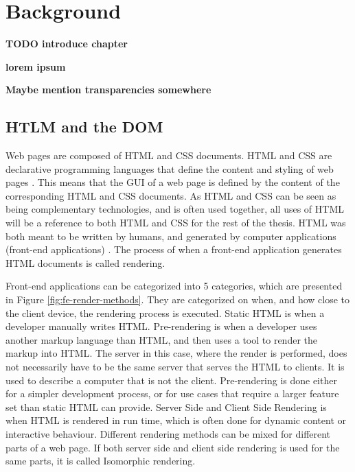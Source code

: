\chapter{Background}

\textbf{TODO introduce chapter}

\textbf{lorem ipsum}

\textbf{Maybe mention transparencies somewhere}

\section{HTLM and the DOM}

Web pages are composed of \ac{HTML} and \ac{CSS} documents. \ac{HTML} and \ac{CSS} are declarative programming languages that define the content and styling of web pages \cite{Lie1999}. This means that the \ac{GUI} of a web page is defined by the content of the corresponding \ac{HTML} and \ac{CSS} documents. As \ac{HTML} and \ac{CSS} can be seen as being complementary technologies, and is often used together, all uses of \ac{HTML} will be a reference to both \ac{HTML} and \ac{CSS} for the rest of the thesis. \ac{HTML} was both meant to be written by humans, and generated by computer applications (front-end applications) \cite{Lie1999}. The process of when a front-end application generates \ac{HTML} documents is called rendering.

Front-end applications can be categorized into 5 categories, which are presented in Figure \ref{fig:fe-render-methods}. They are categorized on when, and how close to the client device, the rendering process is executed. Static \ac{HTML} is when a developer manually writes \ac{HTML}. Pre-rendering is when a developer uses another markup language than \ac{HTML}, and then uses a tool to render the markup into \ac{HTML}. The server in this case, where the render is performed, does not necessarily have to be the same server that serves the \ac{HTML} to clients. It is used to describe a computer that is not the client. Pre-rendering is done either for a simpler development process, or for use cases that require a larger feature set than static \ac{HTML} can provide. Server Side and Client Side Rendering is when \ac{HTML} is rendered in run time, which is often done for dynamic content or interactive behaviour. Different rendering methods can be mixed for different parts of a web page. If both server side and client side rendering is used for the same parts, it is called Isomorphic rendering.

